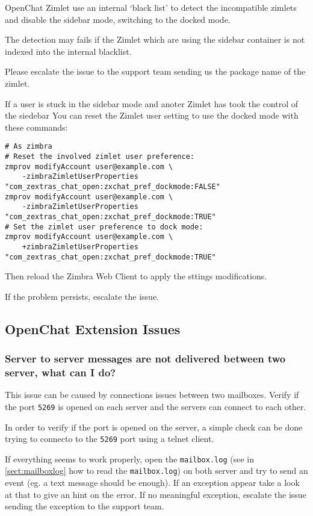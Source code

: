         OpenChat Zimlet use an internal `black list' to detect the incompatible zimlets and disable the sidebar mode, switching
        to the docked mode.

        The detection may fails if the Zimlet which are using the sidebar container is not indexed into the internal
        blacklist.

        Please escalate the issue to the support team sending us the package name of the zimlet.

        If a user is stuck in the sidebar mode and anoter Zimlet has took the control of the siedebar You can reset the
        Zimlet user setting to use the docked mode with these commands:
        \begin{verbatim}
# As zimbra
# Reset the involved zimlet user preference:
zmprov modifyAccount user@example.com \
    -zimbraZimletUserProperties "com_zextras_chat_open:zxchat_pref_dockmode:FALSE"
zmprov modifyAccount user@example.com \
    -zimbraZimletUserProperties "com_zextras_chat_open:zxchat_pref_dockmode:TRUE"
# Set the zimlet user preference to dock mode:
zmprov modifyAccount user@example.com \
    +zimbraZimletUserProperties "com_zextras_chat_open:zxchat_pref_dockmode:TRUE"
        \end{verbatim}

        Then reload the Zimbra Web Client to apply the sttings modifications.

        If the problem persists, escalate the issue.

    \subsection[Extension Issues]{OpenChat Extension Issues}

    \subsubsection{Server to server messages are not delivered between two server, what can I do?}
        This issue can be caused by connections issues between two mailboxes. Verify if the port \verb+5269+ is opened on
        each server and the servers can connect to each other.

        In order to verify if the port is opened on the server, a simple check can be done trying to connecto to the \verb+5269+
        port using a telnet client.

        If everything seems to work properly, open the \verb+mailbox.log+ (see in \autoref{sect:mailboxlog} how to read
        the \verb+mailbox.log+) on both server and try to send an event (eg. a text message should be enough). If an
        exception appear take a look at that to give an hint on the error. If no meaningful exception, escalate the issue
        sending the exception to the support team.

